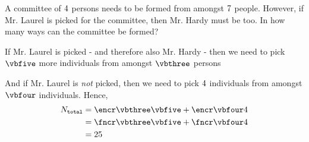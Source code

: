 




\question[2] A committee of $4$ persons needs to be formed from amongst $7$ people. However, 
if Mr. Laurel is picked for the committee, then Mr. Hardy must be too. In how many 
ways can the committee be formed?


\watchout[-30pt]

\ifprintanswers
\fi 

\begin{solution}[\mcq]
	If Mr. Laurel is picked - and therefore also Mr. Hardy - then we need to pick $\vbfive$ more individuals 
	from amongst $\vbthree$ persons
	
	And if Mr. Laurel is \textit{not} picked, then we need to pick $4$ individuals from amongst $\vbfour$ individuals. Hence,
	\begin{align}
		N_{\texttt{total}} &= \encr\vbthree\vbfive + \encr\vbfour\vbone \\
		&= \fncr\vbthree\vbfive + \fncr\vbfour\vbone \\
		&= \vbsix
	\end{align}
\end{solution}
